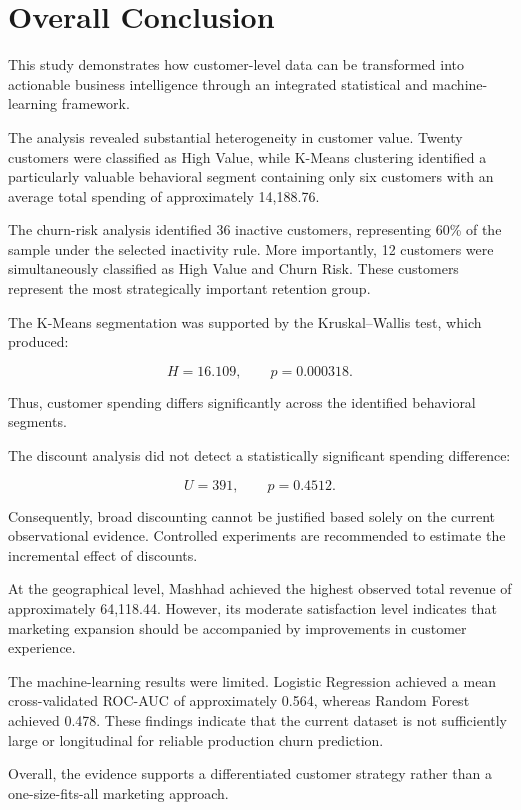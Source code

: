 \documentclass[11pt,a4paper]{article}
\begin{document}
\section{Overall Conclusion}

This study demonstrates how customer-level data can be transformed into actionable business intelligence through an integrated statistical and machine-learning framework.

The analysis revealed substantial heterogeneity in customer value. Twenty customers were classified as High Value, while K-Means clustering identified a particularly valuable behavioral segment containing only six customers with an average total spending of approximately 14,188.76.

The churn-risk analysis identified 36 inactive customers, representing 60\% of the sample under the selected inactivity rule. More importantly, 12 customers were simultaneously classified as High Value and Churn Risk. These customers represent the most strategically important retention group.

The K-Means segmentation was supported by the Kruskal--Wallis test, which produced:

\[
H=16.109,\qquad p=0.000318.
\]

Thus, customer spending differs significantly across the identified behavioral segments.

The discount analysis did not detect a statistically significant spending difference:

\[
U=391,\qquad p=0.4512.
\]

Consequently, broad discounting cannot be justified based solely on the current observational evidence. Controlled experiments are recommended to estimate the incremental effect of discounts.

At the geographical level, Mashhad achieved the highest observed total revenue of approximately 64,118.44. However, its moderate satisfaction level indicates that marketing expansion should be accompanied by improvements in customer experience.

The machine-learning results were limited. Logistic Regression achieved a mean cross-validated ROC-AUC of approximately 0.564, whereas Random Forest achieved 0.478. These findings indicate that the current dataset is not sufficiently large or longitudinal for reliable production churn prediction.

Overall, the evidence supports a differentiated customer strategy rather than a one-size-fits-all marketing approach.
\end{document}
